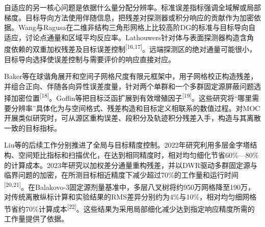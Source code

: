 \documentclass[UTF8, zihao=-4, fontset=none, a4paper]{ctexart}
\newcommand{\upcite}[1]{\textsuperscript{[#1]}}
\begin{document}
自适应的另一核心问题是依据什么量分配分辨率。标准误差指标强调全域解或局部梯度。目标导向方法使用伴随信息，把残差对探测器或积分响应的贡献作为加密依据。Wang与Ragusa在二维非结构三角形网格上比较高阶DG的标准与目标导向自适应，讨论点通量和区域平均反应率。Lathouwers针对体与表面探测器构造含角度依赖的双重加权残差及目标误差控制\upcite{16,17}。远端探测区的绝对通量可能很小，目标导向选择使误差控制与需要评价的响应直接对应。

Baker等在球谐角展开和空间子网格尺度有限元框架中，用子网格校正构造残差，并组合正向、伴随各向异性误差度量，针对两个单群和一个多群固定源屏蔽问题选择加密位置\upcite{18}。Goffin等把目标泛函扩展到有效增殖因子\upcite{19}。这些研究将“哪里需要分辨率”具体化为与空间格式、残差构造和目标定义相联系的数值过程。对MOC开展类似研究时，可从源区重构误差、段积分及轨迹积分残差入手，构造与其离散一致的目标指标。

Liu等的后续工作分别推进了全局与目标精度控制。2022年研究利用多层金字塔结构、空间矩比指标和扫描优化，在达到相同精度时，相对均匀细化节省60\%---80\%的计算成本。2023年研究以加权差分通量重构残差，并以DWR驱动多群固定源与临界问题的加密，在所测目标相近精度下减少超过70\%的工作量和运行时间\upcite{20,21}。在Balakovo-3固定源剂量基准中，多层八叉树将约950万网格降至190万，对传统离散纵标计算和实验结果的RMS差异分别约为4\%与10\%，相对均匀细网格节省约70\%计算成本\upcite{22}。这些结果为采用局部细化减少达到指定响应精度所需的工作量提供了依据。
\end{document}
